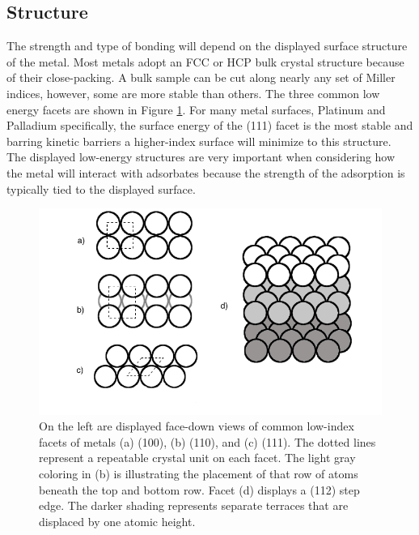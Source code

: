 \subsection{Structure}
The strength and type of bonding will depend on the displayed surface structure
of the metal.  Most metals adopt an FCC or HCP bulk crystal structure because
of their close-packing. A bulk sample can be cut along nearly any set of Miller
indices, however, some are more stable than others.  The three common low
energy facets are shown in Figure \ref{fig:facets}. For many metal surfaces,
Platinum and Palladium specifically, the surface energy of the (111) facet is
the most stable and barring kinetic barriers a higher-index surface will
minimize to this structure. The displayed low-energy structures are very
important when considering how the metal will interact with adsorbates because
the strength of the adsorption is typically tied to the displayed surface.

\begin{figure}
  \includegraphics[width=\linewidth]{../figures/chap1/facets.pdf}
  \caption{On the left are displayed face-down views of common low-index facets
of metals (a) (100), (b) (110), and (c) (111). The dotted lines represent a
repeatable crystal unit on each facet. The light gray coloring in (b) is
illustrating the placement of that row of atoms beneath the top and bottom row.
Facet (d) displays a (112) step edge. The darker shading represents separate
terraces that are displaced by one atomic height.}
\label{fig:facets}
\end{figure}

